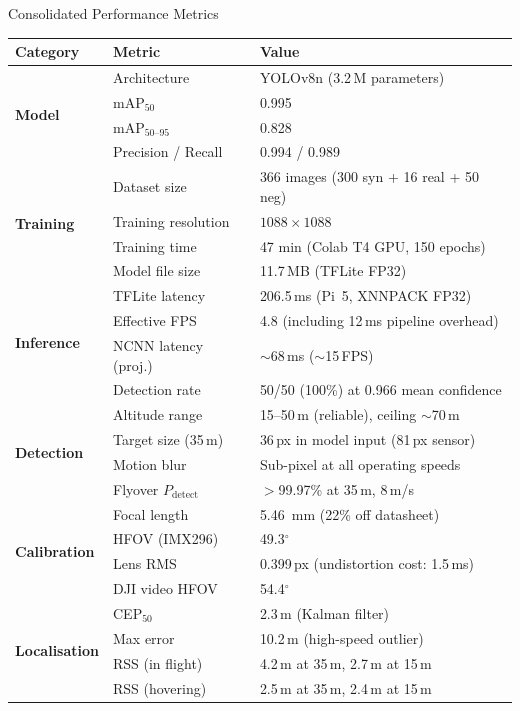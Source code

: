 \documentclass[10pt,a4paper]{article}
\begin{document}
\begin{metricbox}{Consolidated Performance Metrics}
\begin{table}[H]
  \centering
  \renewcommand{\arraystretch}{1.3}
  \begin{tabular}{@{}l l l@{}}
    \toprule
    \textbf{Category} & \textbf{Metric} & \textbf{Value} \\
    \midrule
    \multirow{4}{*}{\textbf{Model}} & Architecture & YOLOv8n (3.2\,M parameters) \\
    & mAP$_{50}$ & 0.995 \\
    & mAP$_{50\text{--}95}$ & 0.828 \\
    & Precision / Recall & 0.994 / 0.989 \\
    \midrule
    \multirow{4}{*}{\textbf{Training}} & Dataset size & 366 images (300 syn + 16 real + 50 neg) \\
    & Training resolution & $1088 \times 1088$ \\
    & Training time & 47 min (Colab T4 GPU, 150 epochs) \\
    & Model file size & 11.7\,MB (TFLite FP32) \\
    \midrule
    \multirow{4}{*}{\textbf{Inference}} & TFLite latency & 206.5\,ms (Pi~5, XNNPACK FP32) \\
    & Effective FPS & 4.8 (including 12\,ms pipeline overhead) \\
    & NCNN latency (proj.) & ${\sim}$68\,ms (${\sim}$15\,FPS) \\
    & Detection rate & 50/50 (100\%) at 0.966 mean confidence \\
    \midrule
    \multirow{4}{*}{\textbf{Detection}} & Altitude range & 15--50\,m (reliable), ceiling ${\sim}$70\,m \\
    & Target size (35\,m) & 36\,px in model input (81\,px sensor) \\
    & Motion blur & Sub-pixel at all operating speeds \\
    & Flyover $P_{\mathrm{detect}}$ & $>$99.97\% at 35\,m, 8\,m/s \\
    \midrule
    \multirow{4}{*}{\textbf{Calibration}} & Focal length & \SI{5.46}{\milli\metre} (22\% off datasheet) \\
    & HFOV (IMX296) & 49.3$^{\circ}$ \\
    & Lens RMS & 0.399\,px (undistortion cost: 1.5\,ms) \\
    & DJI video HFOV & 54.4$^{\circ}$ \\
    \midrule
    \multirow{4}{*}{\textbf{Localisation}} & CEP$_{50}$ & 2.3\,m (Kalman filter) \\
    & Max error & 10.2\,m (high-speed outlier) \\
    & RSS (in flight) & 4.2\,m at 35\,m, 2.7\,m at 15\,m \\
    & RSS (hovering) & 2.5\,m at 35\,m, 2.4\,m at 15\,m \\
    \bottomrule
  \end{tabular}
\end{table}
\end{metricbox}


\printbibliography[title={References}]
\end{document}

